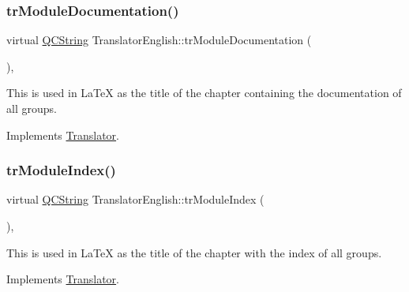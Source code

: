\mbox{\label{class_translator_english_aa79bb78de6d34a0f4e2a24274c0478f7}} 
\subsubsection{\texorpdfstring{trModuleDocumentation()}{trModuleDocumentation()}}
{\footnotesize\ttfamily virtual \mbox{\hyperlink{class_q_c_string}{Q\+C\+String}} Translator\+English\+::tr\+Module\+Documentation (\begin{DoxyParamCaption}{ }\end{DoxyParamCaption})\hspace{0.3cm}{\ttfamily [inline]}, {\ttfamily [virtual]}}

This is used in La\+TeX as the title of the chapter containing the documentation of all groups. 

Implements \mbox{\hyperlink{class_translator}{Translator}}.

\mbox{\label{class_translator_english_a55fc950f6c1c35960564b88dac866314}} 
\subsubsection{\texorpdfstring{trModuleIndex()}{trModuleIndex()}}
{\footnotesize\ttfamily virtual \mbox{\hyperlink{class_q_c_string}{Q\+C\+String}} Translator\+English\+::tr\+Module\+Index (\begin{DoxyParamCaption}{ }\end{DoxyParamCaption})\hspace{0.3cm}{\ttfamily [inline]}, {\ttfamily [virtual]}}

This is used in La\+TeX as the title of the chapter with the index of all groups. 

Implements \mbox{\hyperlink{class_translator}{Translator}}.

\mbox{\label{class_translator_english_a67de294cb689245e927a07a522f92446}} 
